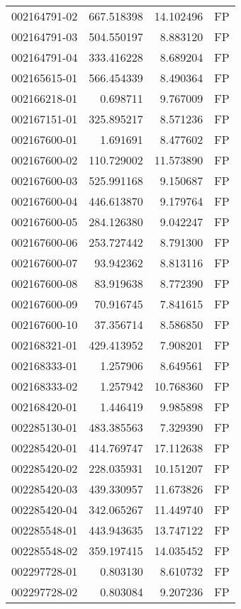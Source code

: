 \begin{tabular}{lrrl}
002164791-02 &  667.518398 &    14.102496 &   FP \\
002164791-03 &  504.550197 &     8.883120 &   FP \\
002164791-04 &  333.416228 &     8.689204 &   FP \\
002165615-01 &  566.454339 &     8.490364 &   FP \\
002166218-01 &    0.698711 &     9.767009 &   FP \\
002167151-01 &  325.895217 &     8.571236 &   FP \\
002167600-01 &    1.691691 &     8.477602 &   FP \\
002167600-02 &  110.729002 &    11.573890 &   FP \\
002167600-03 &  525.991168 &     9.150687 &   FP \\
002167600-04 &  446.613870 &     9.179764 &   FP \\
002167600-05 &  284.126380 &     9.042247 &   FP \\
002167600-06 &  253.727442 &     8.791300 &   FP \\
002167600-07 &   93.942362 &     8.813116 &   FP \\
002167600-08 &   83.919638 &     8.772390 &   FP \\
002167600-09 &   70.916745 &     7.841615 &   FP \\
002167600-10 &   37.356714 &     8.586850 &   FP \\
002168321-01 &  429.413952 &     7.908201 &   FP \\
002168333-01 &    1.257906 &     8.649561 &   FP \\
002168333-02 &    1.257942 &    10.768360 &   FP \\
002168420-01 &    1.446419 &     9.985898 &   FP \\
002285130-01 &  483.385563 &     7.329390 &   FP \\
002285420-01 &  414.769747 &    17.112638 &   FP \\
002285420-02 &  228.035931 &    10.151207 &   FP \\
002285420-03 &  439.330957 &    11.673826 &   FP \\
002285420-04 &  342.065267 &    11.449740 &   FP \\
002285548-01 &  443.943635 &    13.747122 &   FP \\
002285548-02 &  359.197415 &    14.035452 &   FP \\
002297728-01 &    0.803130 &     8.610732 &   FP \\
002297728-02 &    0.803084 &     9.207236 &   FP \\

\end{tabular}
